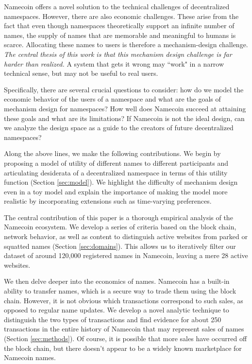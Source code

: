 Namecoin offers a novel solution to the technical challenges of decentralized namespaces. However, there are also economic challenges. These arise from the fact that even though namespaces theoretically support an infinite number of names, the supply of names that are memorable and meaningful to humans is scarce. Allocating these names to users is therefore a mechanism-design challenge. {\em The central thesis of this work is that this mechanism design challenge is far harder than realized.} A system that gets it wrong may ``work" in a narrow technical sense, but may not be useful to real users.

Specifically, there are several crucial questions to consider: how do we model the economic behavior of the users of a namespace and what are the goals of mechanism design for namespaces? How well does Namecoin succeed at attaining these goals and what are its limitations? If Namecoin is not the ideal design, can we analyze the design space as a guide to the creators of future decentralized namespaces?

Along the above lines, we make the following contributions. We begin by proposing a model of utility of different names to different participants and articulating desiderata of a decentralized namespace in terms of this utility function (Section \ref{sec:model}). We highlight the difficulty of mechanism design even in a toy model and explain the importance of making the model more realistic by incorporating extensions such as time-varying preferences.

The central contribution of this paper is a thorough empirical analysis of the Namecoin ecosystem. We develop a series of criteria based on the block chain, network behavior, as well as content to distinguish active websites from parked or squatted names (Section \ref{sec:domains}). This allows us to iteratively filter our dataset of around 120,000 registered names in Namecoin, leaving a mere 28 active websites.

We then delve deeper into the economics of names. Namecoin has a built-in ability to transfer names, which is a secure way to trade them using the block chain. However, it is not obvious which transactions correspond to such sales, as opposed to regular name updates. We develop a novel analytic technique to distinguish the two types of transactions and find evidence for about 250 transactions in the entire history of Namecoin that may represent sales of names (Section \ref{sec:methods}). Of course, it is possible that more sales have occurred off the block chain, but there doesn't appear to be a widely known marketplace for Namecoin names.

